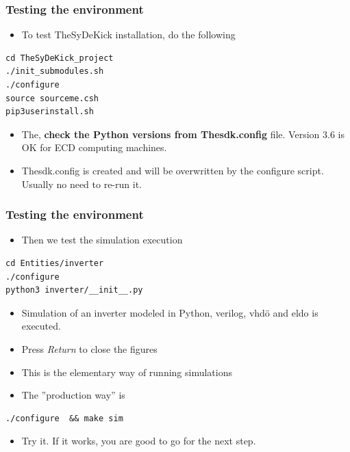 \documentclass[logo=bluequo,normaltitle]{aaltoslides}
\begin{document}

\begin{frame}[t,fragile]
    \frametitle{Testing the environment} 
    \begin{itemize}
            \item To test TheSyDeKick installation, do the following
        \end{itemize}
\begin{lstlisting}
cd TheSyDeKick_project
./init_submodules.sh     
./configure              
source sourceme.csh           
pip3userinstall.sh   
\end{lstlisting}
\begin{itemize}
    \item The, \textbf{check the Python versions from Thesdk.config} file. Version 3.6 is OK
        for ECD computing machines.
    \item Thesdk.config is created and will be overwritten by the configure
        script. Usually no need to re-run it. 
\end{itemize}

\end{frame}

\begin{frame}[t,fragile]
    \frametitle{Testing the environment} 
    \begin{itemize}
            \item Then we test the simulation execution
        \end{itemize}
\begin{lstlisting}
cd Entities/inverter     
./configure              
python3 inverter/__init__.py  
\end{lstlisting}
\begin{itemize}
    \item Simulation of an inverter modeled in Python, verilog, vhdö and eldo
        is executed.
    \item Press \emph{Return} to close the figures
    \item This is the elementary way of running simulations
    \item The ''production way'' is 
\end{itemize}
\begin{lstlisting}
./configure  && make sim          
\end{lstlisting}
\begin{itemize}
    \item Try it. If it works, you are good to go for the next step.
\end{itemize}
\end{frame}
\end{document}
